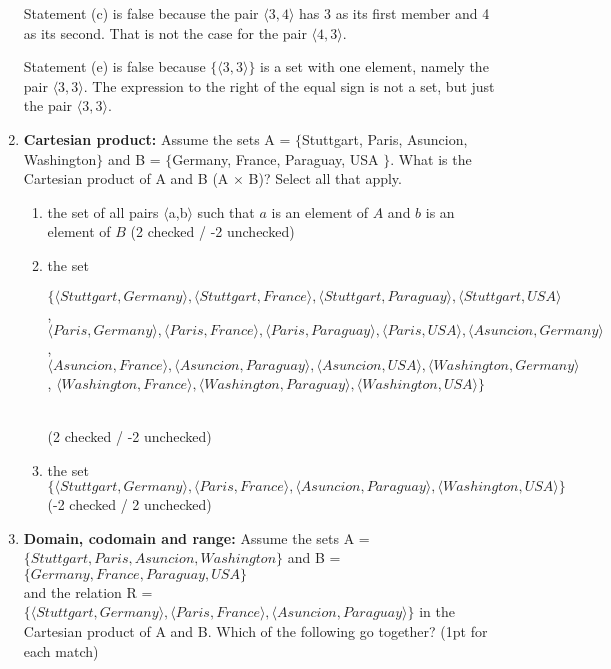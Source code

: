 \documentclass[a4,11pt]{article}
\begin{document}
\begin{enumerate}[leftmargin = 12pt]
Statement (c) is false because the pair $\langle 3,4\rangle$ has 3 as its first member and 4 as its second. That is not the case for the pair $\langle 4, 3 \rangle$.

Statement (e) is false because $\{ \langle 3,3 \rangle\}$ is a set with one element, namely the pair $\langle 3,3\rangle$. The expression to the right of the equal sign is not a set, but just the pair $\langle 3,3\rangle$.

\item {\bf Cartesian product:} Assume the sets A = $\{$Stuttgart, Paris, Asuncion, Washington$\}$  and  B = $\{$Germany, France, Paraguay, USA $\}$. What is the Cartesian product of A and B (A $\times$ B)? Select all that apply.

\begin{enumerate}[noitemsep]
        \item the set of all pairs $\langle$a,b$\rangle$ such that $a$ is an element of $A$ and $b$ is an element of $B$ (2 checked / -2 unchecked)

	\item the set \begin{minipage}[t]{7cm}  $\{\langle Stuttgart, Germany \rangle, \langle Stuttgart, France \rangle, \langle Stuttgart, Paraguay \rangle, \langle Stuttgart, USA \rangle$, $\langle Paris, Germany \rangle, \langle Paris, France \rangle, \langle Paris, Paraguay \rangle, \langle Paris, USA \rangle, \langle Asuncion, Germany \rangle$, $\langle Asuncion, France \rangle , \langle Asuncion, Paraguay \rangle, \langle Asuncion, USA \rangle, \langle Washington, Germany \rangle$, $\langle Washington, France \rangle, \langle Washington, Paraguay \rangle, \langle Washington, USA \rangle\}$ \end{minipage} \\ (2 checked / -2 unchecked)

        \item the set $\{\langle Stuttgart, Germany \rangle, \langle Paris, France \rangle, \langle Asuncion, Paraguay \rangle, \langle Washington, USA \rangle\}$ (-2 checked / 2 unchecked)
\end{enumerate}

\item {\bf Domain, codomain and range:} Assume the sets A = $\{ Stuttgart, Paris, Asuncion, Washington \}$  and  B = $\{ Germany, France, Paraguay, USA \}$ \\ and the relation R = $\{\langle Stuttgart, Germany \rangle, \langle Paris, France \rangle, \langle Asuncion, Paraguay \rangle\}$ in the Cartesian product of A and B. Which of the following go together? (1pt for each match)


\end{enumerate}
\end{document}
